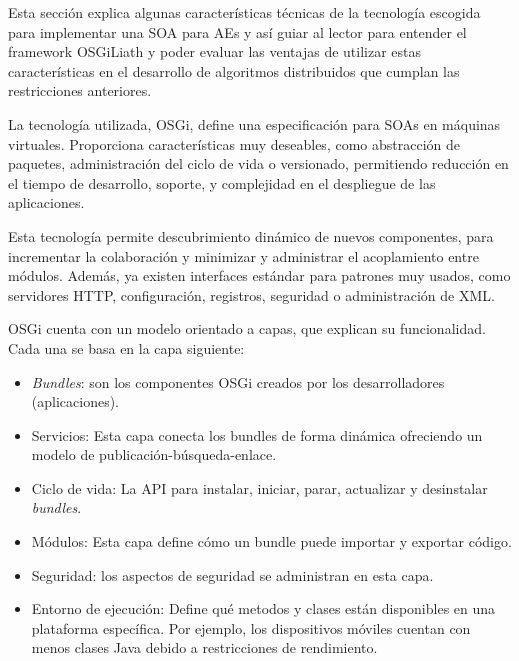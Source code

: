 \documentclass[runningheads]{llncs}
\begin{document}
Esta sección explica algunas características técnicas de la tecnología escogida para implementar una SOA para AEs y así guiar al lector para entender el framework OSGiLiath y poder evaluar las ventajas de utilizar estas características en el desarrollo de algoritmos distribuidos que cumplan las restricciones anteriores.

La tecnología utilizada, OSGi, define una especificación para SOAs en máquinas virtuales. Proporciona características muy deseables, como abstracción de paquetes, administración del ciclo de vida o versionado, permitiendo reducción en el tiempo de desarrollo, soporte, y complejidad en el despliegue de las aplicaciones.

Esta tecnología permite descubrimiento dinámico de nuevos componentes, para incrementar la colaboración y minimizar y administrar el acoplamiento entre módulos. Además, ya existen interfaces estándar para patrones muy usados, como servidores HTTP, configuración, registros, seguridad o administración de XML.

OSGi cuenta con un modelo orientado a capas, que explican su funcionalidad. Cada una se basa en la capa siguiente:

\begin{itemize}
\item {\em Bundles}: son los componentes OSGi creados por los desarrolladores
  (aplicaciones). %
\item Servicios: Esta capa conecta los bundles de forma dinámica ofreciendo un modelo de publicación-búsqueda-enlace.
\item Ciclo de vida: La API para instalar, iniciar, parar, actualizar y desinstalar {\em bundles}.
\item Módulos: Esta capa define cómo un bundle puede importar y exportar código.
\item Seguridad: los aspectos de seguridad se administran en esta capa.
\item Entorno de ejecución: Define qué metodos y clases están disponibles en una plataforma específica. Por ejemplo, los dispositivos móviles cuentan con menos clases Java debido a restricciones de rendimiento.
\end{itemize}
\end{document}
